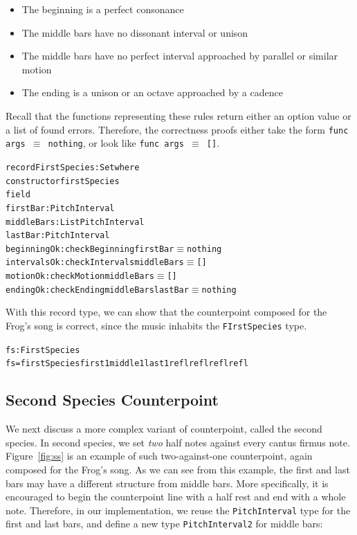\begin{itemize}
  \item The beginning is a perfect consonance
  \item The middle bars have no dissonant interval or unison
  \item The middle bars have no perfect interval approached by
    parallel or similar motion
  \item The ending is a unison or an octave approached by a cadence
\end{itemize}

\noindent Recall that the functions representing these rules return
either an option value or a list of found errors.
Therefore, the correctness proofs either take the form
\texttt{func args $\equiv$ nothing}, or look like
\texttt{func args $\equiv$ []}.

\begin{alltt}
record FirstSpecies : Set where
  constructor firstSpecies
  field
    firstBar    : PitchInterval
    middleBars  : List PitchInterval
    lastBar     : PitchInterval
    beginningOk : checkBeginning firstBar \(\equiv\) nothing
    intervalsOk : checkIntervals middleBars \(\equiv\) []
    motionOk    : checkMotion middleBars \(\equiv\) []
    endingOk    : checkEnding middleBars lastBar \(\equiv\) nothing
\end{alltt}

With this record type, we can show that the counterpoint composed
for the Frog's song is correct, since the music inhabits the
\texttt{FIrstSpecies} type.

\begin{alltt}
fs : FirstSpecies
fs = firstSpecies first1 middle1 last1 refl refl refl refl
\end{alltt}

\subsection{Second Species Counterpoint}
\label{sec:cp:ss}

\SS

We next discuss a more complex variant of counterpoint, called the
second species.
In second species, we set \emph{two} half notes against every cantus
firmus note.
Figure~\ref{fig:ss} is an example of such two-against-one counterpoint,
again composed for the Frog's song.
As we can see from this example, the first and last bars may have
a different structure from middle bars.
More specifically, it is encouraged to begin the counterpoint line with
a half rest and end with a whole note.
Therefore, in our implementation, we reuse the \texttt{PitchInterval} 
type for the first and last bars, and define a new type
\texttt{PitchInterval2} for middle bars:


